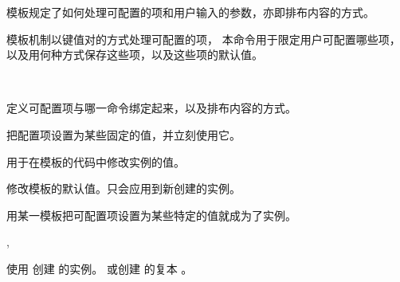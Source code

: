 \documentclass{cusdoc}
\begin{document}
模板规定了如何处理可配置的项和用户输入的参数，亦即排布内容的方式。
\begin{function}[module=lttemplates]{\DeclareTemplateInterface}
  \begin{syntax}
    \V\DeclareTemplateInterface {}   
  \end{syntax}
\LaTeXe 模板机制以键值对的方式处理可配置的项，
本命令用于限定用户可配置哪些项，以及用何种方式保存这些项，以及这些项的默认值。
\end{function}

\begin{function}[module=lttemplates]{\DeclareTemplateCode}
  \begin{syntax}
    \V\DeclareTemplateCode {}  
    ~~ 
  \end{syntax}
定义可配置项与哪一命令绑定起来，以及排布内容的方式。
\end{function}

\begin{function}[module=lttemplates]{\UseTemplate}
  \begin{syntax}
    \V\UseInstance {}   
  \end{syntax}
把配置项设置为某些固定的值，并立刻使用它。
\end{function}

\begin{function}[module=lttemplates]{\SetTemplateKeys}
  \begin{syntax}
    \V\SetTemplateKeys {}  
  \end{syntax}
用于在模板的代码中修改实例的值。
\end{function}

\begin{function}[module=lttemplates]{\EditTemplateDefaults}
  \begin{syntax}
    \V\EditTemplateDefaults {}  
  \end{syntax}
修改模板的默认值。只会应用到新创建的实例。
\end{function}

用某一模板把可配置项设置为某些特定的值就成为了实例。
\begin{function}[module=lttemplates]{\DeclareInstance,\DeclareInstanceCopy}
  \begin{syntax}
    \V\DeclareInstance {}   
    \V\DeclareInstanceCopy {}  
  \end{syntax}
使用  创建  的实例。
或创建  的复本 。
\end{function}
\end{document}
